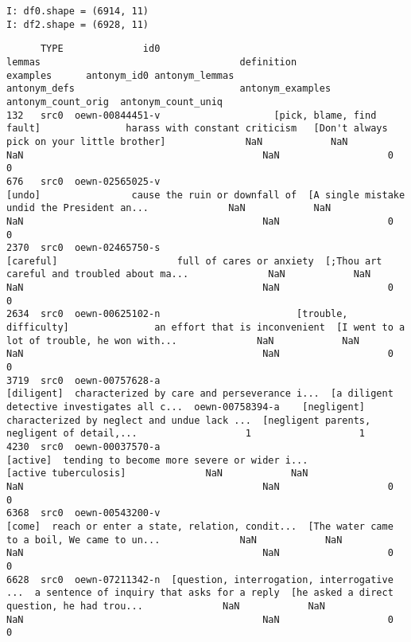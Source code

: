 \documentclass[a4paper,10pt,onecolumn,oneside,openright]{article}
\begin{document}
\begin{verbatim}
I: df0.shape = (6914, 11)
I: df2.shape = (6928, 11)
\end{verbatim}
\begin{verbatim}
      TYPE              id0                                       lemmas                                   definition                                     examples      antonym_id0 antonym_lemmas                                 antonym_defs                             antonym_examples  antonym_count_orig  antonym_count_uniq
132   src0  oewn-00844451-v                    [pick, blame, find fault]               harass with constant criticism   [Don't always pick on your little brother]              NaN            NaN                                          NaN                                          NaN                   0                   0
676   src0  oewn-02565025-v                                       [undo]                cause the ruin or downfall of  [A single mistake undid the President an...              NaN            NaN                                          NaN                                          NaN                   0                   0
2370  src0  oewn-02465750-s                                    [careful]                     full of cares or anxiety  [;Thou art careful and troubled about ma...              NaN            NaN                                          NaN                                          NaN                   0                   0
2634  src0  oewn-00625102-n                        [trouble, difficulty]               an effort that is inconvenient  [I went to a lot of trouble, he won with...              NaN            NaN                                          NaN                                          NaN                   0                   0
3719  src0  oewn-00757628-a                                   [diligent]  characterized by care and perseverance i...  [a diligent detective investigates all c...  oewn-00758394-a    [negligent]  characterized by neglect and undue lack ...  [negligent parents, negligent of detail,...                   1                   1
4230  src0  oewn-00037570-a                                     [active]  tending to become more severe or wider i...                        [active tuberculosis]              NaN            NaN                                          NaN                                          NaN                   0                   0
6368  src0  oewn-00543200-v                                       [come]  reach or enter a state, relation, condit...  [The water came to a boil, We came to un...              NaN            NaN                                          NaN                                          NaN                   0                   0
6628  src0  oewn-07211342-n  [question, interrogation, interrogative ...  a sentence of inquiry that asks for a reply  [he asked a direct question, he had trou...              NaN            NaN                                          NaN                                          NaN                   0                   0
\end{verbatim}
\end{document}

